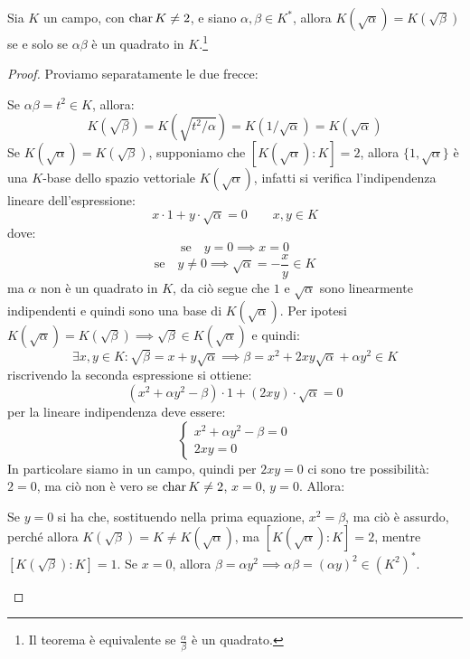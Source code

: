 \documentclass[11pt]{scrartcl}
\begin{document}
\newpage
\begin{theorem}
	Sia $K$ un campo, con $\text{char}\, K \ne 2$, e siano $\alpha,\beta \in K^*$, allora $K(\sqrt{\alpha}) = K(\sqrt{\beta})$ se e solo se $\alpha\beta$ è un quadrato in
	 $K$.\footnote{Il teorema è equivalente se $\frac{\alpha}{\beta}$ è un quadrato.}
\end{theorem}

\begin{proof}
	Proviamo separatamente le due frecce:
	\begin{itemize}
		\ii Se $\alpha\beta = t^2 \in K$, allora:
			\[ K(\sqrt{\beta}) = K(\sqrt{t^2/\alpha}) = K(1/\sqrt{\alpha}) = K(\sqrt{\alpha})
				\]
		\ii Se $K(\sqrt{\alpha}) = K(\sqrt{\beta})$, supponiamo che $[K(\sqrt{\alpha}) : K] = 2$,
		allora $\{1, \sqrt{\alpha}\}$ è una $K$-base dello spazio vettoriale $K(\sqrt{\alpha})$, infatti si verifica l'indipendenza lineare dell'espressione:
			\[ x \cdot 1 + y \cdot \sqrt{\alpha} = 0 \qquad x,y \in K
				\]
		dove:
			\[ \text{se} \quad y = 0 \implies x = 0
				\]
			\[ \text{se} \quad y \ne 0 \implies \sqrt{\alpha} = -\frac{x}{y} \in K
				\]
		ma $\alpha$ non è un quadrato in $K$, da ciò segue che $1$ e $\sqrt{\alpha}$ sono linearmente indipendenti e quindi sono una base di $K(\sqrt{\alpha})$.
		Per ipotesi $K(\sqrt{\alpha}) = K(\sqrt{\beta}) \implies \sqrt{\beta} \in K(\sqrt{\alpha})$ e quindi:
			\[ \exists x,y \in K : \sqrt{\beta} = x + y\sqrt{\alpha} \implies \beta = x^2 + 2xy\sqrt{\alpha} + \alpha y^2 \in K
				\]
		riscrivendo la seconda espressione si ottiene:
			\[ (x^2 + \alpha y^2 - \beta) \cdot 1 + (2xy) \cdot \sqrt{\alpha} = 0
				\]
		per la lineare indipendenza deve essere:
			\[ \begin{cases}
				x^2 + \alpha y^2 - \beta = 0 \\
				2xy = 0
			\end{cases}
				\]
	In particolare siamo in un campo, quindi per $2xy = 0$ ci sono tre possibilità: $2 = 0$, ma ciò non è vero se $\text{char}\, K \ne 2$, $x = 0$, $y = 0$.
	Allora:
	\begin{itemize}
		\ii Se $y = 0$ si ha che, sostituendo nella prima equazione, $x ^ 2 = \beta$, ma ciò è assurdo, perché allora $ K(\sqrt{\beta}) = K \ne  K(\sqrt{\alpha})$, ma 
		$[K(\sqrt{\alpha}) : K] = 2$, mentre $[K(\sqrt{\beta}) : K] = 1$.
		\ii Se $x = 0$, allora $\beta = \alpha y^2 \implies \alpha\beta = (\alpha y)^ 2 \in (K^2)^*$.
	\end{itemize}
	\end{itemize}
\end{proof}
\end{document}
